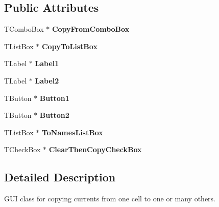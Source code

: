 \subsection*{Public Attributes}
\begin{DoxyCompactItemize}
\item 
\hypertarget{class_t_copy_currents_form_ada9a1f5ae852e881ac216a13282fbb74}{T\+Combo\+Box $\ast$ {\bfseries Copy\+From\+Combo\+Box}}\label{class_t_copy_currents_form_ada9a1f5ae852e881ac216a13282fbb74}

\item 
\hypertarget{class_t_copy_currents_form_ad601405abe7f41fe9bccc4e8a605bde5}{T\+List\+Box $\ast$ {\bfseries Copy\+To\+List\+Box}}\label{class_t_copy_currents_form_ad601405abe7f41fe9bccc4e8a605bde5}

\item 
\hypertarget{class_t_copy_currents_form_acd3c1305a949333e82e9fbdd7adc3794}{T\+Label $\ast$ {\bfseries Label1}}\label{class_t_copy_currents_form_acd3c1305a949333e82e9fbdd7adc3794}

\item 
\hypertarget{class_t_copy_currents_form_afa580bb34184774832d65916cab53614}{T\+Label $\ast$ {\bfseries Label2}}\label{class_t_copy_currents_form_afa580bb34184774832d65916cab53614}

\item 
\hypertarget{class_t_copy_currents_form_aec09380d417659ddb88da495d7d9ee1b}{T\+Button $\ast$ {\bfseries Button1}}\label{class_t_copy_currents_form_aec09380d417659ddb88da495d7d9ee1b}

\item 
\hypertarget{class_t_copy_currents_form_a898b4d631ac5b2377b22e06af1748f30}{T\+Button $\ast$ {\bfseries Button2}}\label{class_t_copy_currents_form_a898b4d631ac5b2377b22e06af1748f30}

\item 
\hypertarget{class_t_copy_currents_form_a38a1815841bf4b1d5d6e52ba1192b35e}{T\+List\+Box $\ast$ {\bfseries To\+Names\+List\+Box}}\label{class_t_copy_currents_form_a38a1815841bf4b1d5d6e52ba1192b35e}

\item 
\hypertarget{class_t_copy_currents_form_a3e18c2da6973bf19e53868eb2141d46e}{T\+Check\+Box $\ast$ {\bfseries Clear\+Then\+Copy\+Check\+Box}}\label{class_t_copy_currents_form_a3e18c2da6973bf19e53868eb2141d46e}

\end{DoxyCompactItemize}


\subsection{Detailed Description}
G\+U\+I class for copying currents from one cell to one or many others. 

